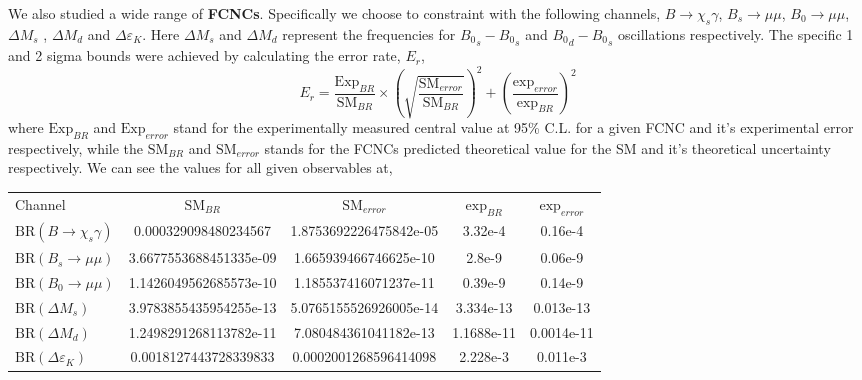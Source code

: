 We also studied a wide range of \textbf{FCNCs}.
%
Specifically we choose to constraint with the following channels, $B \rightarrow \chi_s \gamma$, $B_s \rightarrow \mu \mu$, $B_0 \rightarrow  \mu \mu$, $\Delta M_s$ , $\Delta M_d$ and $\Delta \varepsilon_K$. 
%
Here $\Delta M_s$ and $\Delta M_d$ represent the frequencies for ${B_0}_s - {B_0}_s$ and ${B_0}_d - {B_0}_s$ oscillations respectively. 
%
The specific 1 and 2 sigma bounds were achieved by calculating the error rate, $E_r$, 
\begin{equation}
E_r = \frac{\text{Exp}_{BR}}{\text{SM}_{BR}} \times \left( \sqrt{\frac{\text{SM}_{error}}{\text{SM}_{BR}}}\right)^2 + \left( \frac{\text{exp}_{error}}{\text{exp}_{BR}} \right)^2
\end{equation} 
%
where $\text{Exp}_{BR}$ and $\text{Exp}_{error}$ stand for the experimentally measured central value at 95\% C.L. for a given FCNC and it's experimental error respectively, while the $\text{SM}_{BR}$ and $\text{SM}_{error}$ stands for the FCNCs predicted theoretical value for the SM and it's theoretical uncertainty respectively.  	
% 
We can see the values for all given observables at, 
%
\begin{table}[H]
\centering
\begin{tabular}{l|cccc}
 Channel & $\text{SM}_{BR}$         & $\text{SM}_{error}$ & $\text{exp}_{BR}$ & $\text{exp}_{error}$   \\ \cline{2-5} 
$\text{BR}( B \rightarrow \chi_s \gamma )$ & 0.000329098480234567   & 1.8753692226475842e-05                  & 3.32e-4    & 0.16e-4       \\
$\text{BR}( B_s \rightarrow \mu \mu ) $ & 3.6677553688451335e-09 & 1.665939466746625e-10                   & 2.8e-9     & 0.06e-9       \\
$\text{BR}(B_0 \rightarrow  \mu \mu )$ & 1.1426049562685573e-10 & 1.185537416071237e-11                   & 0.39e-9    & 0.14e-9       \\
$\text{BR}( \Delta M_s ) $ & 3.9783855435954255e-13 & 5.0765155526926005e-14                  & 3.334e-13  &  0.013e-13     \\
$\text{BR}( \Delta M_d )$ & 1.2498291268113782e-11 & 7.080484361041182e-13                   & 1.1688e-11 & 0.0014e-11    \\
$\text{BR}(\Delta \varepsilon_K )$ & 0.0018127443728339833  & 0.0002001268596414098                   & 2.228e-3   & 0.011e-3     
\end{tabular}
\end{table}

